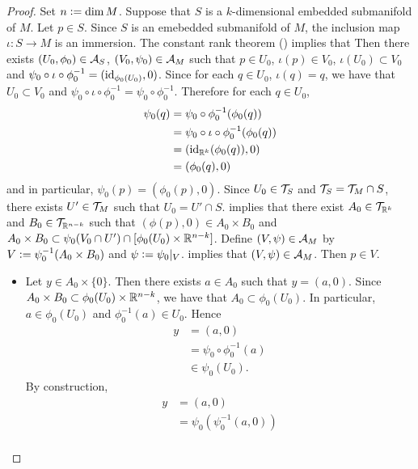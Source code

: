 \documentclass{book}
\begin{document}
	\begin{proof}
		Set $n \vcentcolon= \dim M$. Suppose that $S$ is a $k$-dimensional embedded submanifold of $M$. Let $p \in S$. Since $S$ is an emebedded submanifold of $M$, the inclusion map $\iota: S \rightarrow M$ is an immersion. The constant rank theorem () implies that Then there exists $(U_0, \phi_0) \in \mathcal{A}_S$, $(V_0, \psi_0) \in \mathcal{A}_M$ such that $p \in U_0$, $\iota(p) \in V_0$, $\iota(U_0) \subset V_0$ and $\psi_0 \circ \iota \circ \phi_0^{-1} = (\operatorname{id}_{\phi_0(U_0)}, 0)$. Since for each $q \in U_0$, $\iota(q) = q$, we have that $U_0 \subset V_0$ and $\psi_0 \circ \iota \circ \phi_0^{-1} = \psi_0 \circ \phi_0^{-1}$. Therefore for each $q \in U_0$,
		\begin{align*}
			\psi_0(q)
			& =  \psi_0 \circ \phi_0^{-1} (\phi_0(q)) \\
			& = \psi_0 \circ \iota \circ \phi_0^{-1} (\phi_0(q)) \\
			& = (\operatorname{id}_{\mathbb{R}^k}(\phi_0(q)), 0) \\
			& = (\phi_0(q), 0)
		\end{align*}
		and in particular, $\psi_0(p) = (\phi_0(p), 0)$. Since $U_0 \in \mathcal{T}_S$ and $\mathcal{T}_S = \mathcal{T}_M \cap S$, there exists $U' \in \mathcal{T}_M$ such that $U_0 = U' \cap S$.  implies that there exist $A_0 \in \mathcal{T}_{\mathbb{R}^k}$ and $B_0 \in \mathcal{T}_{\mathbb{R}^{n-k}}$ such that $(\phi(p), 0) \in A_0 \times B_0$ and $A_0 \times B_0 \subset \psi_0(V_0 \cap U') \cap [\phi_0(U_0) \times \mathbb{R}^{n-k}]$. Define $(V, \psi) \in \mathcal{A}_{M}$ by $V \vcentcolon= \psi_0^{-1}(A_0 \times B_0)$ and $\psi \vcentcolon= \psi_0|_V$.  implies that $(V, \psi) \in \mathcal{A}_M$. Then $p \in V$. 
		\begin{itemize}
			\item Let $y \in A_0 \times \{0\}$. Then there exists $a \in A_0$ such that $y = (a,0)$. Since $A_0 \times B_0 \subset \phi_0(U_0) \times \mathbb{R}^{n-k}$, we have that $A_0 \subset \phi_0(U_0)$. In particular, $a \in \phi_0(U_0)$ and $\phi_0^{-1}(a) \in U_0$. Hence
			\begin{align*}
				y
				& = (a, 0) \\
				& = \psi_0 \circ \phi_0^{-1}(a) \\
				& \in \psi_0(U_0).
			\end{align*} 
			By construction,
			\begin{align*}
				y
				& = (a, 0) \\
				& = \psi_0(\psi_0^{-1}(a,0)) \\

\end{align*}
\end{itemize}
\end{proof}
\end{document}
